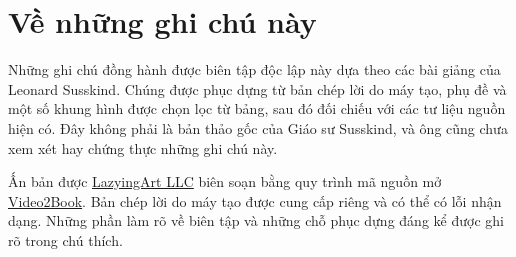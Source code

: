 \documentclass[11pt,oneside]{book}
\begin{document}
\frontmatter
\hypersetup{pageanchor=false}

\hypersetup{pageanchor=true}

\clearpage
\chapter*{Về những ghi chú này}
Những ghi chú đồng hành được biên tập độc lập này dựa theo các bài giảng của Leonard Susskind. Chúng được phục dựng từ bản chép lời do máy tạo, phụ đề và một số khung hình được chọn lọc từ bảng, sau đó đối chiếu với các tư liệu nguồn hiện có. Đây không phải là bản thảo gốc của Giáo sư Susskind, và ông cũng chưa xem xét hay chứng thực những ghi chú này.

Ấn bản được \href{https://lazying.art}{LazyingArt LLC} biên soạn bằng quy trình mã nguồn mở \href{https://github.com/lachlanchen/Video2Book}{Video2Book}. Bản chép lời do máy tạo được cung cấp riêng và có thể có lỗi nhận dạng. Những phần làm rõ về biên tập và những chỗ phục dựng đáng kể được ghi rõ trong chú thích.
\clearpage
\tableofcontents
\mainmatter










\end{document}
